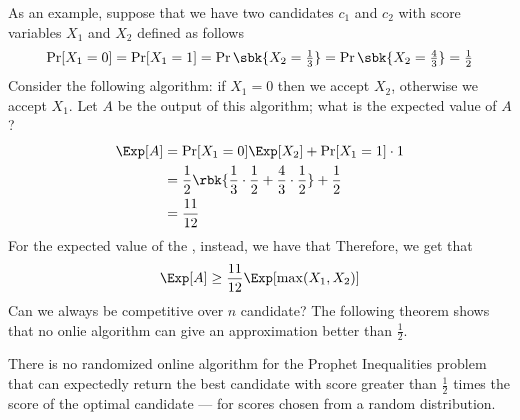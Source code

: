 \documentclass[a4paper, 12pt]{report}
\begin{document}
    As an example, suppose that we have two candidates $c_1$ and $c_2$ with score variables $X_1$ and $X_2$ defined as follows $$\Pr[X_1 = 0] = \Pr[X_1 = 1] = \Pr \sbk{X_2 = \tfrac{1}{3}} = \Pr \sbk {X_2 = \tfrac{4}{3}} = \tfrac{1}{2}$$ Consider the following algorithm: if $X_1 = 0$ then we accept $X_2$, otherwise we accept $X_1$. Let $A$ be the output of this algorithm; what is the expected value of $A$?
    \begin{equation*}
        \begin{split}
            \Exp[A] &= \Pr[X_1 = 0] \Exp[X_2] + \Pr[X_1 = 1] \cdot 1 \\
                    &= \dfrac{1}{2} \rbk{\dfrac{1}{3} \cdot \dfrac{1}{2} + \dfrac{4}{3} \cdot \dfrac{1}{2}} + \dfrac{1}{2} \\
                    &= \dfrac{11}{12}
        \end{split}
    \end{equation*}
    For the expected value of the , instead, we have that
    Therefore, we get that $$\Exp[A] \ge \dfrac{11}{12} \Exp[\max(X_1, X_2)]$$ Can we always be competitive over $n$ candidate? The following theorem shows that no onlie algorithm can give an approximation better than $\tfrac{1}{2}$.

    \begin{framedthm}{}
        There is no randomized online algorithm for the Prophet Inequalities problem that can expectedly return the best candidate with score greater than $\tfrac{1}{2}$ times the score of the optimal candidate --- for scores chosen from a random distribution.
    \end{framedthm}
\end{document}
